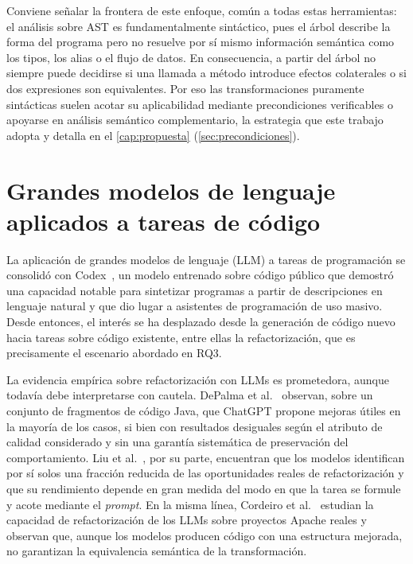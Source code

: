Conviene señalar la frontera de este enfoque, común a todas estas herramientas:
el análisis sobre AST es fundamentalmente sintáctico, pues el árbol describe la
forma del programa pero no resuelve por sí mismo información semántica como los
tipos, los alias o el flujo de datos. En consecuencia, a partir del árbol no
siempre puede decidirse si una llamada a método introduce efectos colaterales o
si dos expresiones son equivalentes. Por eso las transformaciones puramente
sintácticas suelen acotar su aplicabilidad mediante precondiciones verificables
o apoyarse en análisis semántico complementario, la estrategia que este trabajo
adopta y detalla en el \autoref{cap:propuesta} (\autoref{sec:precondiciones}).

\section{Grandes modelos de lenguaje aplicados a tareas de código}
\label{sec:llm-antecedentes}

La aplicación de grandes modelos de lenguaje (LLM) a tareas de programación
se consolidó con Codex~\cite{chen2021codex}, un modelo entrenado sobre código
público que demostró una capacidad notable para sintetizar programas a partir
de descripciones en lenguaje natural y que dio lugar a asistentes de
programación de uso masivo. Desde entonces, el interés se ha desplazado desde
la generación de código nuevo hacia tareas sobre código existente, entre ellas
la refactorización, que es precisamente el escenario abordado en RQ3.

La evidencia empírica sobre refactorización con LLMs es prometedora, aunque
todavía debe interpretarse con cautela. DePalma
et al.~\cite{10.1016/j.eswa.2024.123602} observan, sobre un conjunto de
fragmentos de código Java, que ChatGPT propone mejoras útiles en la mayoría de
los casos, si bien con resultados desiguales según el atributo de calidad
considerado y sin una garantía sistemática de preservación del comportamiento.
Liu et al.~\cite{liu2024llmrefactoring}, por su parte, encuentran que los
modelos identifican por sí solos una fracción reducida de las oportunidades
reales de refactorización y que su rendimiento depende en gran medida del modo
en que la tarea se formule y acote mediante el \emph{prompt}. En la misma línea,
Cordeiro et al.~\cite{cordeiro2024llmrefactoring} estudian la capacidad de
refactorización de los LLMs sobre proyectos Apache reales y observan que,
aunque los modelos producen código con una estructura mejorada, no garantizan la
equivalencia semántica de la transformación.


